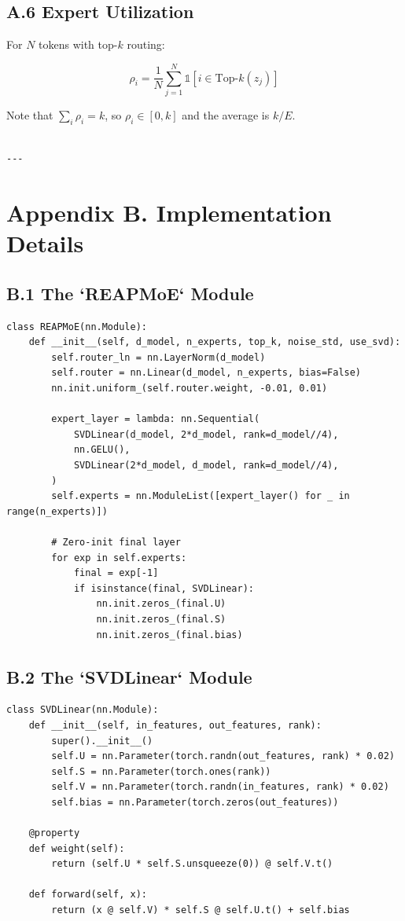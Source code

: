 \subsection{A.6 Expert Utilization}

For $N$ tokens with top-$k$ routing:

\[
\rho_i = \frac{1}{N} \sum_{j=1}^{N} \mathbb{1}[i \in \text{Top-}k(z_j)]
\]

Note that $\sum_i \rho_i = k$, so $\rho_i \in [0, k]$ and the average is 
$k / E$.
\begin{lstlisting}

---
\end{lstlisting}

\section{Appendix B. Implementation Details}

\subsection{B.1 The `REAPMoE` Module}

\begin{lstlisting}
class REAPMoE(nn.Module):
    def __init__(self, d_model, n_experts, top_k, noise_std, use_svd):
        self.router_ln = nn.LayerNorm(d_model)
        self.router = nn.Linear(d_model, n_experts, bias=False)
        nn.init.uniform_(self.router.weight, -0.01, 0.01)
        
        expert_layer = lambda: nn.Sequential(
            SVDLinear(d_model, 2*d_model, rank=d_model//4),
            nn.GELU(),
            SVDLinear(2*d_model, d_model, rank=d_model//4),
        )
        self.experts = nn.ModuleList([expert_layer() for _ in range(n_experts)])
        
        # Zero-init final layer
        for exp in self.experts:
            final = exp[-1]
            if isinstance(final, SVDLinear):
                nn.init.zeros_(final.U)
                nn.init.zeros_(final.S)
                nn.init.zeros_(final.bias)
\end{lstlisting}

\subsection{B.2 The `SVDLinear` Module}

\begin{lstlisting}
class SVDLinear(nn.Module):
    def __init__(self, in_features, out_features, rank):
        super().__init__()
        self.U = nn.Parameter(torch.randn(out_features, rank) * 0.02)
        self.S = nn.Parameter(torch.ones(rank))
        self.V = nn.Parameter(torch.randn(in_features, rank) * 0.02)
        self.bias = nn.Parameter(torch.zeros(out_features))
    
    @property
    def weight(self):
        return (self.U * self.S.unsqueeze(0)) @ self.V.t()
    
    def forward(self, x):
        return (x @ self.V) * self.S @ self.U.t() + self.bias
\end{lstlisting}

